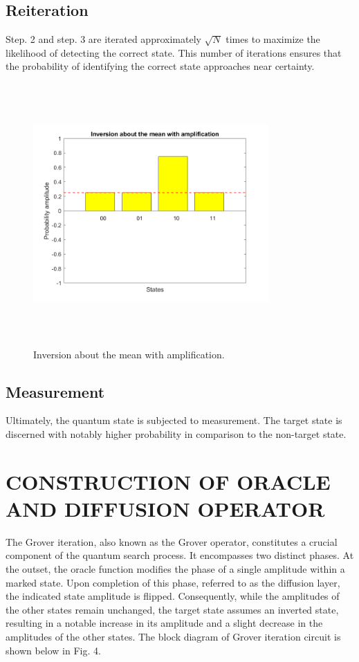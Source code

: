 \documentclass[conference]{IEEEtran}
\begin{document}
\subsection{Reiteration}
Step. 2 and step. 3 are iterated approximately $ \sqrt{N} $ times
to maximize the likelihood of detecting the correct state. This
number of iterations ensures that the probability of identifying
the correct state approaches near certainty.

\begin{figure}[htbp]
	\centerline{\includegraphics[width=9cm,height=10cm,keepaspectratio]{fig3.png}}
	\caption{Inversion about the mean with amplification.}
	\label{fig3}
\end{figure}

\subsection{ Measurement}
Ultimately, the quantum state is subjected to measurement.
The target state is discerned with notably higher probability in comparison to the non-target state.

\section{ CONSTRUCTION OF ORACLE AND DIFFUSION
  OPERATOR}
The Grover iteration, also known as the Grover operator,
constitutes a crucial component of the quantum search process.
It encompasses two distinct phases. At the outset, the oracle
function modifies the phase of a single amplitude within a
marked state. Upon completion of this phase, referred to as
the diffusion layer, the indicated state amplitude is flipped.
Consequently, while the amplitudes of the other states remain
unchanged, the target state assumes an inverted state, resulting
in a notable increase in its amplitude and a slight decrease in
the amplitudes of the other states. The block diagram of Grover
iteration circuit is shown below in Fig. 4.
\end{document}
